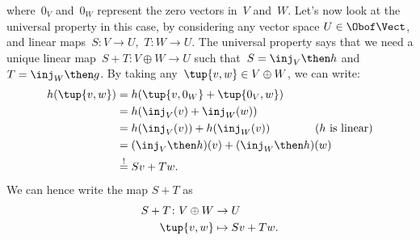 {\begin{example}
		where~$0_V$ and~$0_W$ represent the zero vectors in~$V$ and~$W$.
		Let's now look at the universal property in this case, by considering any vector space $U\in \Obof\Vect$, and linear maps~$S\colon V\to U$,~$T\colon W\to U$.
		The universal property says that we need a unique linear map~$S+T\colon V\oplus W \to U$ such that~$S=\inj_V\then h$ and~$T=\inj_W\then g$.
		By taking any~$\tup{v,w}\in V\oplus W$, we can write:
		\begin{equation*}
			\begin{aligned}
				h(\tup{v,w}) & =h(\tup{v,0_W}+\tup{0_V,w})                                    \\
				             & =h(\inj_V(v)+\inj_W(w))                                        \\
				             & =h(\inj_V(v))+h(\inj_W(v)) \qquad \qquad (h \text{ is linear}) \\
				             & =(\inj_V\then h)(v)+(\inj_W\then h)(w)                         \\
				             & \overset{!
				}{=}
				Sv+Tw.
			\end{aligned}
		\end{equation*}
		We can hence write the map $S+T$ as
		\begin{equation*}
			\begin{aligned}
				S+T\colon V\oplus W & \to U          \\
				\tup{v,w}           & \mapsto Sv+Tw.
			\end{aligned}
		\end{equation*}
	\end{example}
}
